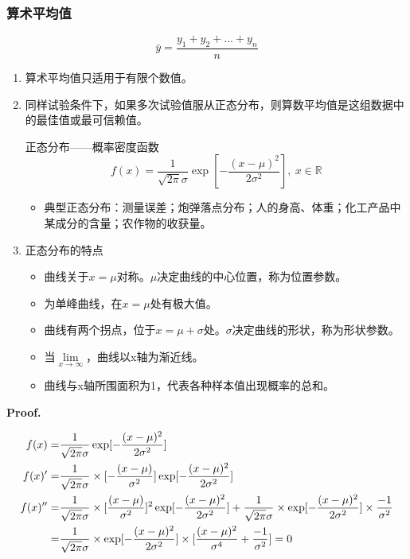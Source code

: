 \documentclass[UTF8]{ctexart}
\begin{document}
\subsubsection{算术平均值}
\begin{equation}
\bar{y}=\frac{{y_1}+{y_2}+...+{y_n}}{n}
\end{equation}


\begin{enumerate}[•]
\item 算术平均值只适用于有限个数值。
\item 同样试验条件下，如果多次试验值服从正态分布，则算数平均值是这组数据中的最佳值或最可信赖值。

\par 正态分布——概率密度函数
\begin{equation}
f(x)=\frac{1}{\sqrt{2\pi}\sigma}\exp[-\frac{(x-\mu)^2}{2\sigma^2}],\ x\in \mathbb{R} 
\end{equation}

\begin{itemize}
\item 典型正态分布：测量误差；炮弹落点分布；人的身高、体重；化工产品中某成分的含量；农作物的收获量。
\end{itemize}
\item 正态分布的特点
\begin{itemize}
\item 曲线关于$x=\mu$对称。$\mu$决定曲线的中心位置，称为位置参数。
\item 为单峰曲线，在$x=\mu$处有极大值。
\item 曲线有两个拐点，位于$x=\mu+\sigma$处。$\sigma$决定曲线的形状，称为形状参数。
\item 当$\lim\limits_{x\to\infty}$，曲线以x轴为渐近线。
\item 曲线与x轴所围面积为1，代表各种样本值出现概率的总和。
\end{itemize}
\end{enumerate}

\textbf{Proof.}

\begin{equation}
 \begin{aligned}\notag
    f(x)=&\frac{1}{\sqrt{2\pi}\sigma}\exp[-\frac{(x-\mu)^2}{2\sigma^2}]
  \\f(x)'=&\frac{1}{\sqrt{2\pi}\sigma}\times[-\frac{(x-\mu)}{\sigma^2}]\exp[-\frac{(x-\mu)^2}{2\sigma^2}]
  \\f(x)''=&\frac{1}{\sqrt{2\pi}\sigma}\times{[\frac{(x-\mu)}{\sigma^2}]^2}\exp[-\frac{(x-\mu)^2}{2\sigma^2}]
            +\frac{1}{\sqrt{2\pi}\sigma}\times\exp[-\frac{(x-\mu)^2}{2\sigma^2}]\times \frac{-1}{\sigma ^2}
  \\=&\frac{1}{\sqrt{2\pi}\sigma}\times\exp[-\frac{(x-\mu)^2}{2\sigma^2}]\times[\frac{(x-\mu )^2}{\sigma ^4}
            +\frac{-1}{\sigma ^2}]=0
 \end{aligned}
\end{equation}
\end{document}

